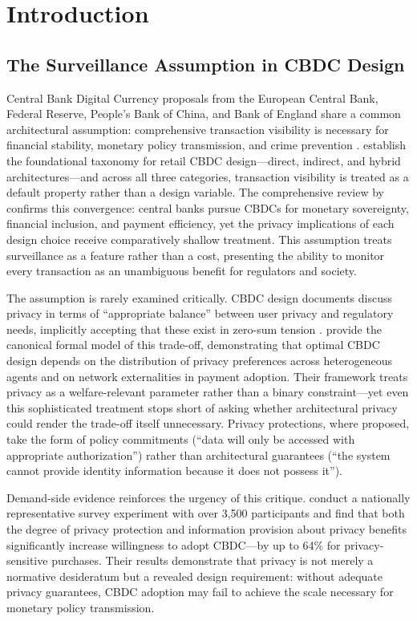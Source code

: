 \documentclass[11pt]{article}
\begin{document}
\section{Introduction}

\subsection{The Surveillance Assumption in CBDC Design}

Central Bank Digital Currency proposals from the European Central Bank, Federal Reserve, People's Bank of China, and Bank of England share a common architectural assumption: comprehensive transaction visibility is necessary for financial stability, monetary policy transmission, and crime prevention \citep{BIS2020, ECB2020, Auer2021}. \citet{AuerBohme2020} establish the foundational taxonomy for retail CBDC design---direct, indirect, and hybrid architectures---and across all three categories, transaction visibility is treated as a default property rather than a design variable. The comprehensive review by \citet{AuerFrostGambacorta2022} confirms this convergence: central banks pursue CBDCs for monetary sovereignty, financial inclusion, and payment efficiency, yet the privacy implications of each design choice receive comparatively shallow treatment. This assumption treats surveillance as a feature rather than a cost, presenting the ability to monitor every transaction as an unambiguous benefit for regulators and society.

The assumption is rarely examined critically. CBDC design documents discuss privacy in terms of ``appropriate balance'' between user privacy and regulatory needs, implicitly accepting that these exist in zero-sum tension \citep{ECB2020}. \citet{AgurAriDellAriccia2022} provide the canonical formal model of this trade-off, demonstrating that optimal CBDC design depends on the distribution of privacy preferences across heterogeneous agents and on network externalities in payment adoption. Their framework treats privacy as a welfare-relevant parameter rather than a binary constraint---yet even this sophisticated treatment stops short of asking whether architectural privacy could render the trade-off itself unnecessary. Privacy protections, where proposed, take the form of policy commitments (``data will only be accessed with appropriate authorization'') rather than architectural guarantees (``the system cannot provide identity information because it does not possess it'').

Demand-side evidence reinforces the urgency of this critique. \citet{choi2025cbdcprivacy} conduct a nationally representative survey experiment with over 3,500 participants and find that both the degree of privacy protection and information provision about privacy benefits significantly increase willingness to adopt CBDC---by up to 64\% for privacy-sensitive purchases. Their results demonstrate that privacy is not merely a normative desideratum but a revealed design requirement: without adequate privacy guarantees, CBDC adoption may fail to achieve the scale necessary for monetary policy transmission.
\end{document}
